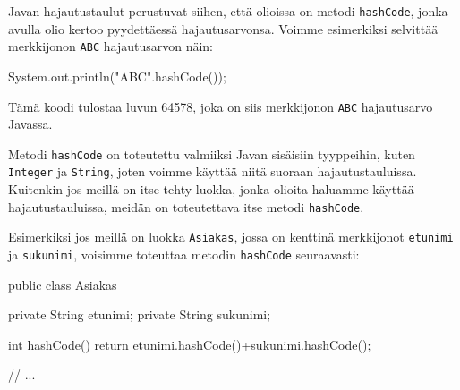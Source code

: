 Javan hajautustaulut perustuvat siihen, että olioissa
on metodi \texttt{hashCode}, jonka avulla olio kertoo
pyydettäessä hajautusarvonsa.
Voimme esimerkiksi selvittää merkkijonon \texttt{ABC}
hajautusarvon näin:

\begin{code}
System.out.println("ABC".hashCode());
\end{code}

Tämä koodi tulostaa luvun 64578,
joka on siis merkkijonon \texttt{ABC} hajautusarvo Javassa.

Metodi \texttt{hashCode} on toteutettu valmiiksi Javan
sisäisiin tyyppeihin, kuten \texttt{Integer} ja \texttt{String},
joten voimme käyttää niitä suoraan hajautustauluissa.
Kuitenkin jos meillä on itse tehty luokka, jonka olioita
haluamme käyttää hajautustauluissa, meidän on toteutettava
itse metodi \texttt{hashCode}.

Esimerkiksi jos meillä on luokka \texttt{Asiakas},
jossa on kenttinä merkkijonot
\texttt{etunimi} ja \texttt{sukunimi},
voisimme toteuttaa metodin \texttt{hashCode} seuraavasti:

\begin{code}
public class Asiakas {
    private String etunimi;
    private String sukunimi;

    int hashCode() {
        return etunimi.hashCode()+sukunimi.hashCode();
    }

    // ...
}
\end{code}
